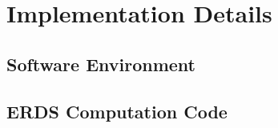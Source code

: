 \chapter{Implementation Details}
\label{app:implementation}



\section{Software Environment}
\label{app:software}

%
%


\section{ERDS Computation Code}
\label{app:erds_code}

%

